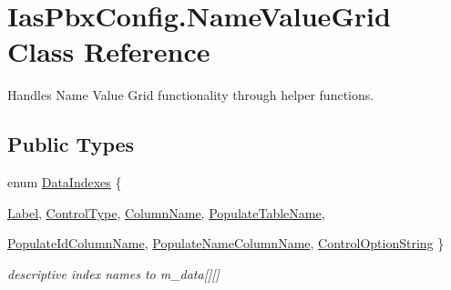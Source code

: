 \hypertarget{class_ias_pbx_config_1_1_name_value_grid}{
\section{IasPbxConfig.NameValueGrid Class Reference}
\label{class_ias_pbx_config_1_1_name_value_grid}
}


Handles Name Value Grid functionality through helper functions.  
\subsection*{Public Types}
\begin{DoxyCompactItemize}
\item 
enum \hyperlink{class_ias_pbx_config_1_1_name_value_grid_ad252779c8bb45743ebf71025b284957e}{DataIndexes} \{ \par
\hyperlink{class_ias_pbx_config_1_1_name_value_grid_ad252779c8bb45743ebf71025b284957e}{Label}, 
\hyperlink{class_ias_pbx_config_1_1_name_value_grid_ad252779c8bb45743ebf71025b284957e}{ControlType}, 
\hyperlink{class_ias_pbx_config_1_1_name_value_grid_ad252779c8bb45743ebf71025b284957e}{ColumnName}, 
\hyperlink{class_ias_pbx_config_1_1_name_value_grid_ad252779c8bb45743ebf71025b284957e}{PopulateTableName}, 
\par
\hyperlink{class_ias_pbx_config_1_1_name_value_grid_ad252779c8bb45743ebf71025b284957e}{PopulateIdColumnName}, 
\hyperlink{class_ias_pbx_config_1_1_name_value_grid_ad252779c8bb45743ebf71025b284957e}{PopulateNameColumnName}, 
\hyperlink{class_ias_pbx_config_1_1_name_value_grid_ad252779c8bb45743ebf71025b284957e}{ControlOptionString}
 \}
\begin{DoxyCompactList}\small\item\em descriptive index names to m\_\-data\mbox{[}\mbox{]}\mbox{[}\mbox{]} \item\end{DoxyCompactList}\end{DoxyCompactItemize}
